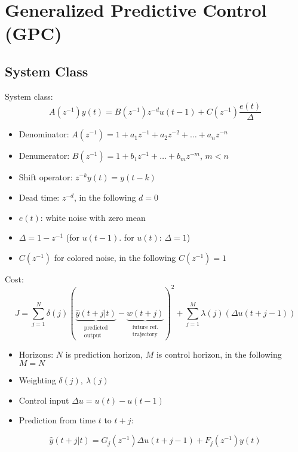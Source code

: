 \documentclass[english]{latex4ei/latex4ei_sheet}
\begin{document}
\section{Generalized Predictive Control (GPC)}
\begin{sectionbox}

\subsection{System Class}
System class:\\ 
$$A\left(z^{-1}\right) y(t)=B\left(z^{-1}\right) z^{-d} u(t-1)+C\left(z^{-1}\right) \frac{e(t)}{\Delta}$$
\begin{itemize}
    \item Denominator: $A\left(z^{-1}\right)=1+a_{1} z^{-1}+a_{2} z^{-2}+\ldots+a_{n} z^{-n}$
    \item Denumerator: $B\left(z^{-1}\right)=1+b_{1} z^{-1}+\ldots+b_{m} z^{-m}$, $m<n$
    \item Shift operator: $z^{-k} y(t)=y(t-k)$
    \item Dead time: $z^{-d}$, in the following $d=0$
    \item $e(t)$: white noise with zero mean
    \item $\Delta=1-z^{-1}$ (for $u(t-1)$. for $u(t)$: $\Delta=1$)
    \item $C\left(z^{-1}\right)$ for colored noise, in the following $C\left(z^{-1}\right)=1$
\end{itemize}
Cost: 
$$J=\sum_{j=1}^{N} \delta(j)(\underbrace{\hat{y}(t+j | t)}_{\substack{\text{predicted} \\ \text{output}}}-\underbrace{w(t+j)}_{\substack{\text{future ref.} \\ \text{trajectory}}})^{2}+\sum_{j=1}^{M} \lambda(j)(\Delta u(t+j-1))
$$
\begin{itemize}
    \item Horizons: $N$ is prediction horizon, $M$ is control horizon, in the following $M=N$
    \item Weighting $\delta(j),\ \lambda(j)$
    \item Control input $\Delta u = u(t)-u(t-1)$
    \item Prediction from time $t$ to $t+j$:
\end{itemize}
$$\hat{y}(t+j | t)=G_{j}(z^{-1})\Delta u(t+j-1)+F_{j}(z^{-1})y(t)
$$


\end{sectionbox}
\end{document}
